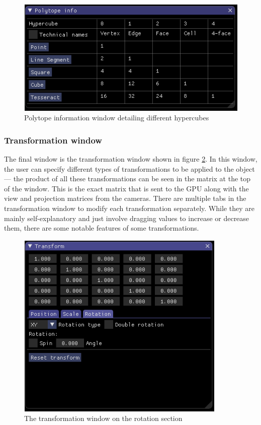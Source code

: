 \documentclass[11pt, a4paper]{article}
\begin{document}
\begin{figure}[!h]
  \centering
  \includegraphics[width=12cm]{img/polytope_information.png}
  \caption{Polytope information window detailing different hypercubes}
  \label{fig:informationWindow}
\end{figure}

\subsubsection{Transformation window}
\label{subsubsec:transformationWindow}

The final window is the transformation window shown in figure \ref{fig:transformationWindow}. In this window, the user can specify different types of transformations to be applied to the object --- the product of all these transformations can be seen in the matrix at the top of the window. This is the exact matrix that is sent to the GPU along with the view and projection matrices from the cameras. There are multiple tabs in the transformation window to modify each transformation separately. While they are mainly self-explanatory and just involve dragging values to increase or decrease them, there are some notable features of some transformations.

\begin{figure}[!h]
  \centering
  \includegraphics[width=10cm]{img/transformation_window.png}
  \caption{The transformation window on the rotation section}
  \label{fig:transformationWindow}
\end{figure}
\end{document}
